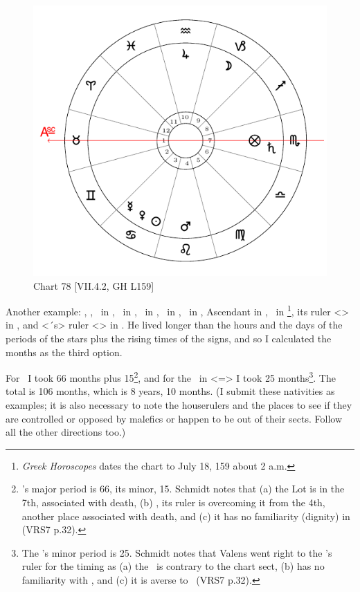 \newpage
\begin{figure}
\centering
\vspace{-10pt}
\includegraphics[width=.68\textwidth]{charts/7_4_2}
\caption{Chart 78 [VII.4.2, GH L159]}
\label{fig:chart78}
\end{figure} 

Another example: \Sun, \Venus, \Mercury\, in \Cancer, \Moon\, in \Capricorn, \Saturn\, in \Scorpio, \Jupiter\, in \Aquarius, \Mars\, in \Leo, Ascendant in \Taurus, \Fortune\, in \Scorpio\footnote{\textit{Greek Horoscopes} dates the chart to July 18, 159 about 2 a.m.}, its ruler <\Mars> in \Leo, and <\Leo´s> ruler <\Sun> in \Cancer. He lived longer than the hours and the days of the periods of the stars plus the rising times of the signs, and so I calculated the months as the third option. 

For \Mars\, I took 66 months plus 15\footnote{\Mars's major period is 66, its minor, 15. Schmidt notes that (a) the Lot is in the 7th, associated with death, (b) \Mars, its ruler is overcoming it from the 4th, another place associated with death, and (c) it has no familiarity (dignity) in \Leo (VRS7 p.32).}, and for the \Sun\, in \Cancer <=\Moon> I took 25 months\footnote{The \Moon's minor period is 25. Schmidt notes that Valens went right to the \Sun's ruler for the timing as (a) the \Sun\, is contrary to the chart sect, (b) has no familiarity with \Cancer, and (c) it is averse to \Mars\, (VRS7 p.32).}. The total is 106 months, which is 8 years, 10 months. (I submit these nativities as examples; it is also necessary to note the houserulers and the places to see
if they are controlled or opposed by malefics or happen to be out of their sects. Follow all the other directions too.)


